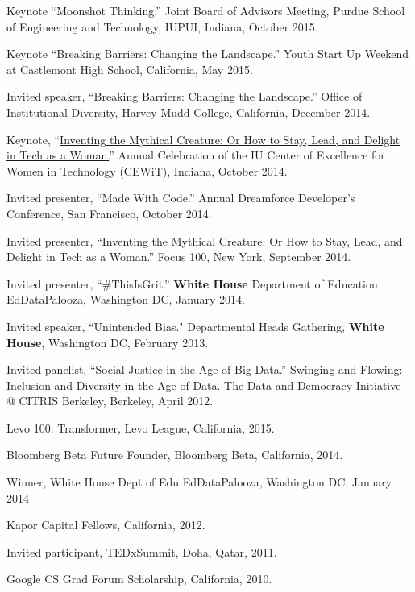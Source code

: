\documentclass[11pt,article,oneside]{memoir}
\begin{document}
\ind Keynote ``Moonshot Thinking.'' Joint Board of Advisors Meeting, Purdue School of Engineering and Technology, IUPUI, Indiana, October 2015.

\ind Keynote ``Breaking Barriers: Changing the Landscape.'' Youth Start Up Weekend at Castlemont High School, California, May 2015. 

\ind Invited speaker, ``Breaking Barriers: Changing the Landscape.'' Office of Institutional Diversity, Harvey Mudd College, California, December 2014. 

\ind Keynote, ``\href{https://www.youtube.com/watch?v=owXez6sIRbY&ab_channel=IUCEWIT}{Inventing the Mythical Creature: Or How to Stay, Lead, and Delight in Tech as a Woman.}'' Annual Celebration of the IU Center of Excellence for Women in Technology (CEWiT), Indiana, October 2014.

\ind Invited presenter, ``Made With Code.'' Annual Dreamforce Developer's Conference, San Francisco, October 2014.

\ind Invited presenter, ``Inventing the Mythical Creature: Or How to Stay, Lead, and Delight in Tech as a Woman.'' Focus 100, New York, September 2014.

\ind Invited presenter, ``\#ThisIsGrit.'' \textbf{White House} Department of Education EdDataPalooza, Washington DC, January 2014.

\ind Invited speaker, ``Unintended Bias." Departmental Heads Gathering, \textbf{White House}, Washington DC, February 2013.

\ind Invited panelist, ``Social Justice in the Age of Big Data.'' Swinging and Flowing: Inclusion and Diversity in the Age of Data. The Data and Democracy Initiative @ CITRIS Berkeley, Berkeley, April 2012.

\bigskip 

\medskip

\ind Levo 100: Transformer, Levo League, California, 2015.

\ind Bloomberg Beta Future Founder, Bloomberg Beta, California, 2014. 

\ind Winner, White House Dept of Edu EdDataPalooza, Washington DC, January 2014

\ind Kapor Capital Fellows, California, 2012.

\ind Invited participant, TEDxSummit, Doha, Qatar, 2011.

\ind Google CS Grad Forum Scholarship, California, 2010.
\end{document}

